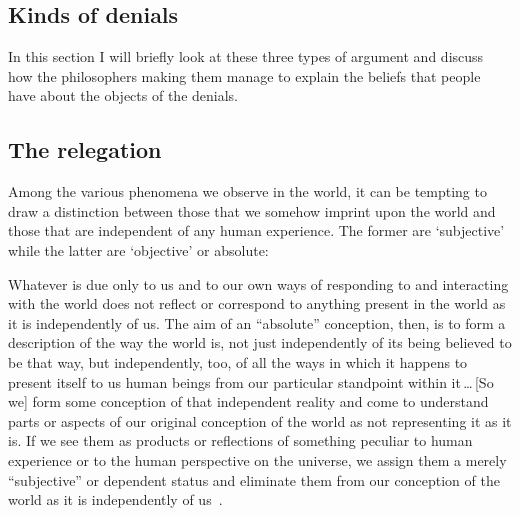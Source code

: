 \documentclass[11pt]{standalone}
\newenvironment{squote}{%
	\begin{spacing}{1}
	\begin{list}{}{%
	\setlength{\labelwidth}{0pt}%
	\rightmargin\leftmargin%
	}
	\item\relax
	}{%
	\end{list}%
	\end{spacing}
	}
\begin{document}
\begin{spacing}{1.5}
\section{Kinds of denials}
In this section I will briefly look at these three types of argument
and discuss how the philosophers making them manage to explain the
beliefs that people have about the objects of the denials.

\subsection{The relegation}
\label{relegate}
Among the various phenomena we observe in the world, it can be
tempting to draw a distinction between those that we somehow imprint
upon the world and those that are independent of any human experience.
The former are `subjective' while the latter are `objective' or
absolute:
\begin{squote}
Whatever is due only to us and to our own ways of responding to and
interacting with the world does not reflect or correspond to anything
present in the world as it is independently of us.  The aim of an
``absolute'' conception, then, is to form a description of the way the
world is, not just independently of its being believed to be that way,
but independently, too, of all the ways in which it happens to present
itself to us human beings from our particular standpoint within
it\,\ldots\,[So we] form some conception of that independent reality
and come to understand parts or aspects of our original conception of
the world as not representing it as it is.  If we see them as products
or reflections of something peculiar to human experience or to the
human perspective on the universe, we assign them a merely
``subjective'' or dependent status and eliminate them from our
conception of the world as it is independently of
us~\citep[30--31]{stroud2000a}.
\end{squote}


\end{spacing}
\end{document}
